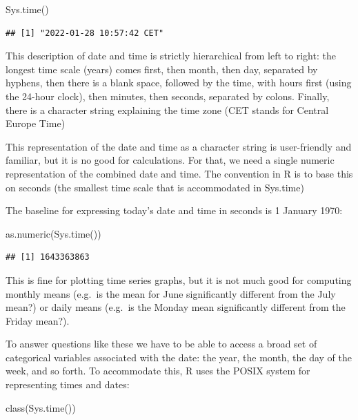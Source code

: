 \documentclass[
]{book}
\newenvironment{Shaded}{\begin{snugshade}}{\end{snugshade}}
\newcommand{\FunctionTok}[1]{\textcolor[rgb]{0.00,0.00,0.00}{#1}}
\newcommand{\NormalTok}[1]{#1}
\theoremstyle{definition}
\theoremstyle{definition}
\theoremstyle{definition}
\theoremstyle{definition}
\theoremstyle{remark}
\begin{document}
\begin{Shaded}
\begin{Highlighting}[]
\FunctionTok{Sys.time}\NormalTok{()}
\end{Highlighting}
\end{Shaded}

\begin{verbatim}
## [1] "2022-01-28 10:57:42 CET"
\end{verbatim}

This description of date and time is strictly hierarchical from left to right: the longest time scale (years) comes first, then month, then day, separated by hyphens, then there is a blank space, followed by the time, with hours first (using the 24-hour clock), then minutes, then seconds, separated by colons. Finally, there is a character string explaining the time zone (CET stands for Central Europe Time)

This representation of the date and time as a character string is user-friendly and familiar, but it is no good for calculations. For that, we need a single numeric representation of the combined date and time. The convention in R is to base this on seconds (the smallest time scale that is accommodated in Sys.time)

The baseline for expressing today's date and time in seconds is 1 January 1970:

\begin{Shaded}
\begin{Highlighting}[]
\FunctionTok{as.numeric}\NormalTok{(}\FunctionTok{Sys.time}\NormalTok{())}
\end{Highlighting}
\end{Shaded}

\begin{verbatim}
## [1] 1643363863
\end{verbatim}

This is fine for plotting time series graphs, but it is not much good for computing monthly means (e.g.~is the mean for June significantly different from the July mean?) or daily means (e.g.~is the Monday mean significantly different from the Friday mean?).

To answer questions like these we have to be able to access a broad set of categorical variables associated with the date: the year, the month, the day of the week, and so forth. To accommodate this, R uses the POSIX system for representing times and dates:

\begin{Shaded}
\begin{Highlighting}[]
\FunctionTok{class}\NormalTok{(}\FunctionTok{Sys.time}\NormalTok{())}
\end{Highlighting}
\end{Shaded}
\end{document}
